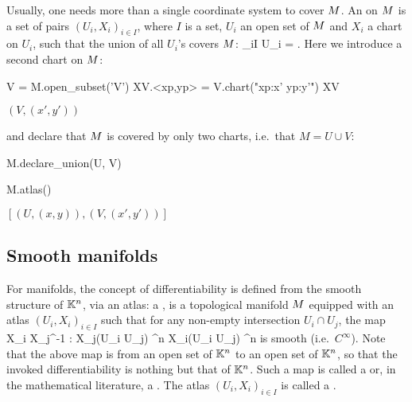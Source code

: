 Usually, one needs more than a single coordinate system to cover $M$.
An  on $M$ is a set of pairs
$(U_i,X_i)_{i\in I}$, where $I$ is a set, $U_i$ an open set of $M$ and $X_i$ a chart on $U_i$,
such that the union of all $U_i$'s covers $M$:
\be
    \bigcup_{i\in I} U_i = \M.
\ee
Here we introduce a second chart on $M$:
\begin{NBin}
V = M.open_subset('V')
XV.<xp,yp> = V.chart("xp:x' yp:y'")
XV
\end{NBin}
\begin{NBout}
$\left( V, (x', y') \right)$
\end{NBout}
and declare that $M$ is covered by only two charts, i.e.\ that $M=U\cup V$:
\begin{NBin}
M.declare_union(U, V)
\end{NBin}
\begin{NBin}
M.atlas()
\end{NBin}
\begin{NBout}
$\left[ \left(U, (x,y) \right), \left( V, (x', y') \right) \right]$
\end{NBout}

\subsection{Smooth manifolds}

For manifolds, the concept of differentiability is
defined from the smooth structure of $\mathbb{K}^n$, via an atlas:
a ,
is a topological manifold $M$ equipped with an atlas
$(U_i,X_i)_{i\in I}$ such that for any non-empty intersection
$U_i \cap U_j$, the map
\be \label{e:bas:transition_map}
    X_i \circ X_j^{-1} : X_j(U_i \cap U_j)
    \subset \K^n \longrightarrow X_i(U_i \cap U_j)
    \subset \K^n
\ee
is smooth (i.e.~$C^\infty$).
Note that the above map is from an open set of $\mathbb{K}^n$ to an open set of $\mathbb{K}^n$, so that the invoked differentiability is nothing but that of $\mathbb{K}^n$.
Such a map is called a  or, in the mathematical literature, a
.
The atlas $(U_i,X_i)_{i\in I}$ is called a
.

